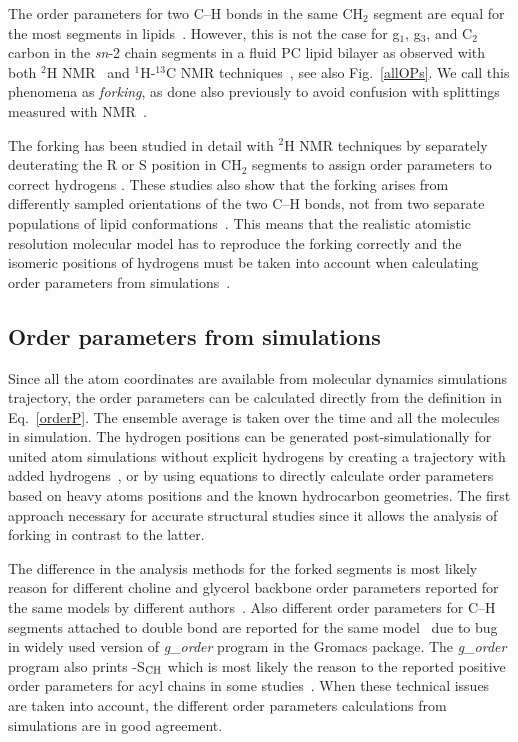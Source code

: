 \documentclass[aps,prl,superscriptaddress,twocolumn]{revtex4}
\begin{document}
The order parameters for two C--H bonds in the same CH$_2$ segment are equal for the most segments in 
lipids~\cite{seelig74,seelig77,seelig78,gally81,gross97,dvinskikh05a,ferreira13}.
However, this is not the case for g$_1$, g$_3$, and  C$_2$ carbon in the \textit{sn}-2 chain segments in
a fluid PC lipid bilayer as observed with both $^2$H NMR~\cite{seelig75,seelig78,engel81,gally81} and 
$^1$H-$^{13}$C NMR techniques~\cite{gross97,dvinskikh05a,ferreira13}, see also Fig.~\ref{allOPs}.
We call this phenomena as {\it forking}, as done also previously to avoid confusion with splittings measured with NMR~\cite{botan15}.

The forking has been studied in detail with $^2$H NMR techniques by separately deuterating the 
R or S position in CH$_2$ segments to assign order parameters to correct hydrogens \cite{gally81,engel81}.
These studies also show that the forking arises from differently sampled orientations 
of the two C--H bonds, not from two separate populations of lipid conformations~\cite{engel81,gally81}.
This means that the realistic atomistic resolution molecular model has to reproduce the forking 
correctly and the isomeric positions of hydrogens must be taken into account when calculating
order parameters from simulations~\cite{botan15}.



\subsection{Order parameters from simulations}

Since all the atom coordinates are available from molecular dynamics simulations trajectory,
the order parameters can be calculated directly from the definition in Eq.~\ref{orderP}.
The ensemble average is taken over the time and all the molecules in simulation.
The hydrogen positions can be generated post-simulationally for united atom simulations without explicit hydrogens 
by creating a trajectory with added hydrogens~\cite{ollila07a,botan15}, or by using equations to directly calculate 
order parameters~\cite{tieleman97,vermeer07} based on heavy atoms positions and the known hydrocarbon geometries.
The first approach necessary for accurate structural studies since it allows the analysis of forking in contrast to the latter.

The difference in the analysis methods for the forked segments is most likely reason for different choline and glycerol
backbone order parameters reported for the same models by different authors~\cite{poger12,botan15}.
Also different order parameters for C--H segments attached to double bond are reported for the same model~\cite{bachar04,ollila07a}
due to bug in widely used version of {\it g\_order} program in the Gromacs package.
The {\it g\_order} program also prints -S$_{{\rm CH}}$ which is most likely the reason to
the reported positive order parameters for acyl chains in some studies~\cite{ekkabut07}.
When these technical issues are taken into account, the different order parameters calculations from simulations are 
in good agreement.
\end{document}
